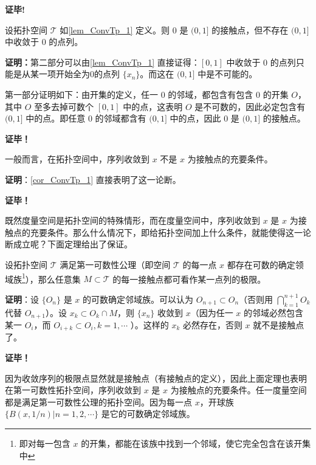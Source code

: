  \textbf{证毕!}

\begin{corollary}{}\label{cor_ConvTp_1}
设拓扑空间 $\mathcal T$ 如\autoref{lem_ConvTp_1} 定义。则 $0$ 是 $(0,1]$ 的接触点，但不存在 $(0,1]$ 中收敛于 $0$ 的点列。
\end{corollary}
\textbf{证明：}第二部分可以由\autoref{lem_ConvTp_1} 直接证得：$[0,1]$ 中收敛于 $0$ 的点列只能是从某一项开始全为0的点列 $\{x_n\}$。而这在 $(0,1]$ 中是不可能的。

第一部分证明如下：由开集的定义，任一 $0$ 的邻域，都包含有包含 $0$ 的开集 $O$，其中 $O$ 至多去掉可数个 $[0,1]$ 中的点，这表明 $O$ 是不可数的，因此必定包含有 $(0,1]$ 中的点。即任意 $0$ 的邻域都含有 $(0,1]$ 中的点，因此 $0$ 是 $(0,1]$ 的接触点。 

\textbf{证毕！}


 \begin{theorem}{}
 一般而言，在拓扑空间中，序列收敛到 $x$ 不是 $x$ 为接触点的充要条件。
 \end{theorem}
 \textbf{证明}：\autoref{cor_ConvTp_1} 直接表明了这一论断。

 \textbf{证毕！}

既然度量空间是拓扑空间的特殊情形，而在度量空间中，序列收敛到 $x$ 是 $x$ 为接触点的充要条件。那么什么情况下，即给拓扑空间加上什么条件，就能使得这一论断成立呢？下面定理给出了保证。


\begin{theorem}{}
设拓扑空间 $\mathcal T$ 满足第一可数性公理（即空间 $\mathcal T$ 的每一点 $x$ 都存在可数的确定领域族\footnote{即对每一包含 $x$ 的开集，都能在该族中找到一个邻域，使它完全包含在该开集中}），那么任意集 $M\subset\mathcal T$ 的每一接触点都可看作某一点列的极限。
\end{theorem}

 \textbf{证明}：设 $\{O_n\}$ 是 $x$ 的可数确定邻域族。可以认为 $O_{n+1}\subset O_n$（否则用 $\bigcap_{k=1}^{n+1} O_{k}$ 代替 $O_{n+1}$）。设 $x_k\subset O_k\cap M$，则 $\{x_n\}$ 收敛到 $x$（因为任一 $x$ 的邻域必然包含某一 $O_i$，而 $O_{i+k}\subset O_{i},k=1,\cdots$ ）。这样的 $x_k$ 必然存在，否则 $x$ 就不是接触点了。 

 
 \textbf{证毕！}

因为收敛序列的极限点显然就是接触点（有接触点的定义），因此上面定理也表明在第一可数性拓扑空间，序列收敛到 $x$ 是 $x$ 为接触点的充要条件。任一度量空间都是满足第一可数性公理的拓扑空间。因为每一点 $x$，开球族 $\{B(x,1/n)|n=1,2,\cdots\}$ 是它的可数确定邻域族。




